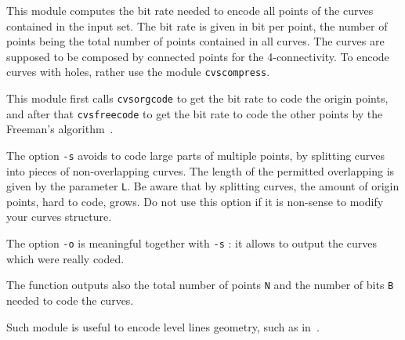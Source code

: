 This module computes the bit rate needed to encode
all points of the curves contained in the input set.
The bit rate is given in bit per point, the number of points being
the total number of points contained in all curves.
The curves are supposed to be composed by connected points
for the 4-connectivity. To encode curves with holes, rather use
the module \verb+cvscompress+.

This module first calls \verb+cvsorgcode+ to get the 
bit rate to code the origin points, and after that
\verb+cvsfreecode+ to get the bit rate to code the other points
by the Freeman's algorithm~\cite{freeman:computer}.

The option \verb+-s+ avoids to code large parts of multiple points,
by splitting curves into pieces of non-overlapping curves.
The length of the permitted overlapping is given by the parameter
\verb+L+. 
Be aware that by splitting curves, the amount of origin points,
hard to code, grows.
Do not use this option if it is non-sense to modify your curves 
structure.

The option \verb+-o+ is meaningful together with \verb+-s+ : it
allows to output the curves which were really coded.

The function outputs also the total number of points \verb+N+
and the number of bits \verb+B+ needed to code the curves.

Such module is useful to encode level lines geometry, such as 
in~\cite{froment:functional}.
